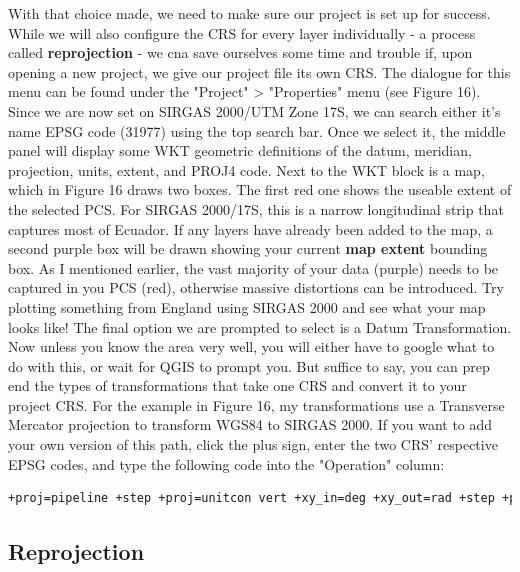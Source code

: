 \documentclass{article}
\begin{document}
With that choice made, we need to make sure our project is set up for success. While we will also configure the CRS for every layer individually - a process called \textbf{reprojection} - we cna save ourselves some time and trouble if, upon opening a new project, we give our project file its own CRS. The dialogue for this menu can be found under the "Project" > "Properties" menu (see Figure 16). Since we are now set on SIRGAS 2000/UTM Zone 17S, we can search either it's name EPSG code (31977) using the top search bar. Once we select it, the middle panel will display some WKT geometric definitions of the datum, meridian, projection, units, extent, and PROJ4 code. Next to the WKT block is a map, which in Figure 16 draws two boxes. The first red one shows the useable extent of the selected PCS. For SIRGAS 2000/17S, this is a narrow longitudinal strip that captures most of Ecuador. If any layers have already been added to the map, a second purple box will be drawn showing your current \textbf{map extent} bounding box. As I mentioned earlier, the vast majority of your data (purple) needs to be captured in you PCS (red), otherwise massive distortions can be introduced. Try plotting something from England using SIRGAS 2000 and see what your map looks like! The final option we are prompted to select is a Datum Transformation. Now unless you know the area very well, you will either have to google what to do with this, or wait for QGIS to prompt you. But suffice to say, you can prep end the types of transformations that take one CRS and convert it to your project CRS. For the example in Figure 16, my transformations use a Transverse Mercator projection to transform WGS84 to SIRGAS 2000. If you want to add your own version of this path, click the plus sign, enter the two CRS' respective EPSG codes, and type the following code into the "Operation" column:

\begin{lstlisting}[language=bash]
    +proj=pipeline +step +proj=unitcon vert +xy_in=deg +xy_out=rad +step +proj=utm +zone=17 +south +ellps=GRS80
\end{lstlisting}

\subsection{Reprojection}
\end{document}
